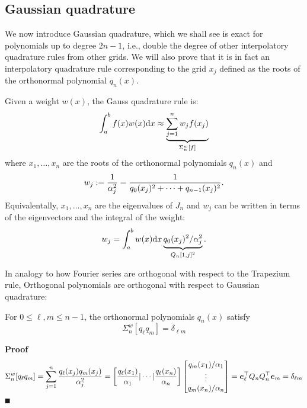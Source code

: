 \subsection{Gaussian quadrature}
We now introduce Gaussian quadrature, which we shall see is exact for polynomials up to degree $2n-1$, i.e., double the degree of other interpolatory quadrature rules from other grids. We will also prove that it is in fact an interpolatory quadrature rule corresponding to the grid $x_j$ defined as the roots of the orthonormal polynomial $q_n(x)$.

\begin{definition} Given a weight $w(x)$, the Gauss quadrature rule is:
\[
\ensuremath{\int}_a^b f(x)w(x) {\rm d}x \ensuremath{\approx} \underbrace{\ensuremath{\sum}_{j=1}^n w_j f(x_j)}_{\ensuremath{\Sigma}_n^w[f]}
\]
where $x_1,\ensuremath{\ldots},x_n$ are the roots of the orthonormal polynomials $q_n(x)$ and 
\[
w_j := {1 \over \ensuremath{\alpha}_j^2} = {1 \over q_0(x_j)^2 + \ensuremath{\cdots} + q_{n-1}(x_j)^2}.
\]
Equivalentally, $x_1,\ensuremath{\ldots},x_n$ are the eigenvalues of $J_n$ and $w_j$ can be written in terms of the eigenvectors and the integral of the weight:
\[
w_j = \ensuremath{\int}_a^b w(x) {\rm d}x \underbrace{q_0(x_j)^2/\ensuremath{\alpha}_j^2}_{Q_n[1,j]^2}.
\]
\end{definition}

In analogy to how Fourier series are orthogonal with respect to the Trapezium rule, Orthogonal polynomials are orthogonal with respect to Gaussian quadrature:

\begin{lemma} For $0 \ensuremath{\leq} \ensuremath{\ell},m \ensuremath{\leq} n-1$, the orthonormal polynomials $q_n(x)$ satisfy
\[
\ensuremath{\Sigma}_n^w[q_\ensuremath{\ell} q_m] = \ensuremath{\delta}_{\ensuremath{\ell}m}
\]
\end{lemma}
\textbf{Proof}
\[
\Sigma_n^w[q_\ell q_m] = \sum_{j=1}^n {q_\ell(x_j) q_m(x_j) \over \alpha_j^2}
= \left[{q_\ell(x_1)\over \alpha_1} | \cdots | {q_\ell(x_n) \over \alpha_n}\right] 
\begin{bmatrix}
q_m(x_1)/\alpha_1 \\
\vdots \\
q_m(x_n)/\alpha_n \end{bmatrix} = \bm{{\mbox{\boldmath$e$\unboldmath}}}_\ell^\top Q_n Q_n^\top \bm{{\mbox{\boldmath$e$\unboldmath}}}_m = \delta_{\ell m}
\]
\ensuremath{\QED}

